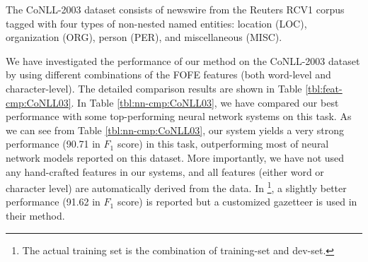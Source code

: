 \documentclass[11pt,a4paper]{article}
\newcommand{\cmark}{\ding{51}}
\newcommand{\xmark}{\ding{55}}
\begin{document}
The CoNLL-2003 dataset \cite{tjong2003introduction} consists of newswire from the Reuters RCV1 corpus tagged with four types of non-nested named entities: location (LOC), organization (ORG), person (PER), and miscellaneous (MISC).

We have investigated the performance of our method on the CoNLL-2003 dataset by using different combinations of the FOFE features (both word-level and character-level). The detailed comparison results are shown in Table \ref{tbl:feat-cmp:CoNLL03}.  In Table \ref{tbl:nn-cmp:CoNLL03}, we have compared our best performance with some top-performing neural network systems on this task. As we can see from Table \ref{tbl:nn-cmp:CoNLL03}, our system yields a very strong performance (90.71 in $F_1$ score) in this task, outperforming most of neural network models reported on this dataset. More importantly, we have not used any hand-crafted features in our systems, and all features (either word or character level) are automatically derived from the data. 
In \cite{chiu2016named}\footnote{The actual training set is the combination of training-set and dev-set.}, a slightly better performance (91.62 in $F_1$ score) is reported but a customized gazetteer is used in their method.


\end{document}
